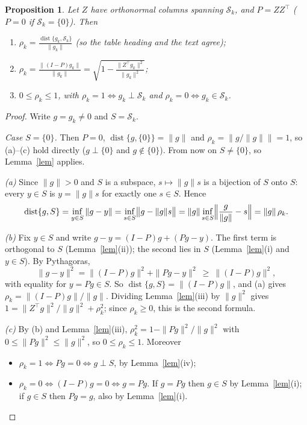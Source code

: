 \documentclass[11pt]{article}
\newtheorem{proposition}{Proposition}
\theoremstyle{definition}
\newcommand{\Sk}{\mathcal{S}_k}
\newcommand{\dist}{\operatorname{dist}}
\begin{document}
\begin{proposition}\label{prop}
Let $Z$ have orthonormal columns spanning $\Sk$, and $P=ZZ^{\top}$
($P=0$ if $\Sk=\{0\}$). Then
\begin{enumerate}
\item[(a)] $\displaystyle\rho_k=\frac{\dist\{g_k,\Sk\}}{\|g_k\|}$
  \quad (so the table heading and the text agree);
\item[(b)] $\displaystyle\rho_k=\frac{\|(I-P)g_k\|}{\|g_k\|}
  =\sqrt{1-\frac{\|Z^{\top}g_k\|^2}{\|g_k\|^2}}$;
\item[(c)] $0\le\rho_k\le1$, with $\rho_k=1\iff g_k\perp\Sk$ and
  $\rho_k=0\iff g_k\in\Sk$.
\end{enumerate}
\end{proposition}

\begin{proof}
Write $g=g_k\ne0$ and $S=\Sk$.

\emph{Case $S=\{0\}$.} Then $P=0$, $\dist\{g,\{0\}\}=\|g\|$ and
$\rho_k=\bigl\|g/\|g\|\bigr\|=1$, so (a)--(c) hold directly ($g\perp\{0\}$
and $g\notin\{0\}$). From now on $S\ne\{0\}$, so Lemma~\ref{lem} applies.

\emph{(a)} Since $\|g\|>0$ and $S$ is a subspace, $s\mapsto\|g\|s$ is a
bijection of $S$ onto $S$: every $y\in S$ is $y=\|g\|s$ for exactly one
$s\in S$. Hence
\[
\dist\{g,S\}=\inf_{y\in S}\|g-y\|
=\inf_{s\in S}\bigl\|g-\|g\|s\bigr\|
=\|g\|\inf_{s\in S}\Bigl\|\frac{g}{\|g\|}-s\Bigr\|
=\|g\|\,\rho_k .
\]

\emph{(b)} Fix $y\in S$ and write $g-y=(I-P)g+(Pg-y)$. The first term is
orthogonal to $S$ (Lemma~\ref{lem}(ii)); the second lies in $S$ (Lemma~\ref{lem}(i)
and $y\in S$). By Pythagoras,
\[
\|g-y\|^2=\|(I-P)g\|^2+\|Pg-y\|^2\ \ge\ \|(I-P)g\|^2 ,
\]
with equality for $y=Pg\in S$. So $\dist\{g,S\}=\|(I-P)g\|$, and (a) gives
$\rho_k=\|(I-P)g\|/\|g\|$. Dividing Lemma~\ref{lem}(iii) by $\|g\|^2$ gives
$1=\|Z^{\top}g\|^2/\|g\|^2+\rho_k^2$; since $\rho_k\ge0$, this is the second
formula.

\emph{(c)} By (b) and Lemma~\ref{lem}(iii),
$\rho_k^2=1-\|Pg\|^2/\|g\|^2$ with $0\le\|Pg\|^2\le\|g\|^2$, so
$0\le\rho_k\le1$. Moreover
\begin{itemize}
\item $\rho_k=1\iff Pg=0\iff g\perp S$, by Lemma~\ref{lem}(iv);
\item $\rho_k=0\iff (I-P)g=0\iff g=Pg$. If $g=Pg$ then $g\in S$ by
  Lemma~\ref{lem}(i); if $g\in S$ then $Pg=g$, also by Lemma~\ref{lem}(i).
\qedhere
\end{itemize}
\end{proof}
\end{document}
